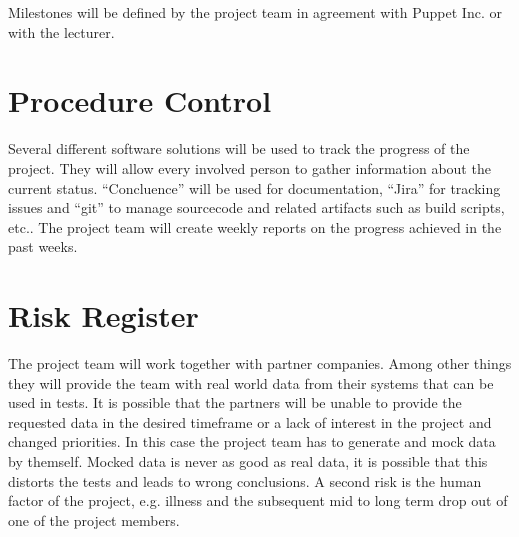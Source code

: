 Milestones will be defined by the project team in agreement with Puppet Inc. or
with the lecturer.

\section{Procedure Control}

Several different software solutions will be used to track the progress of the
project. They will allow every involved person to gather information about the
current status. ``Concluence'' will be used for documentation, ``Jira'' for tracking
issues and ``git'' to manage sourcecode and related artifacts such as build
scripts, etc.. The project team will create weekly reports on the progress
achieved in the past weeks.

\section{Risk Register}

The project team will work together with partner companies. Among other things they will
provide the team with real world data from their systems that can be used in tests.
It is possible that the partners will be unable to provide the requested data in the
desired timeframe or a lack of interest in the project and changed priorities.
In this case the project team has to generate and mock data by themself. Mocked data is never
as good as real data, it is possible that this distorts the tests and leads to
wrong conclusions. A second risk is the human factor of the project, e.g.
illness and the subsequent mid to long term drop out of one of the project
members.

